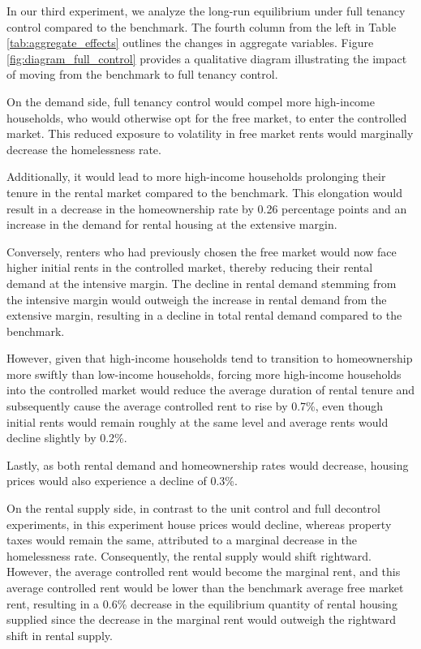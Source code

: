 \documentclass[parskip=full]{article}
\begin{document}
In our third experiment, we analyze the long-run equilibrium under full tenancy control compared to the benchmark. The fourth column from the left in Table \ref{tab:aggregate_effects} outlines the changes in aggregate variables. Figure \ref{fig:diagram_full_control} provides a qualitative diagram illustrating the impact of moving from the benchmark to full tenancy control.

On the demand side, full tenancy control would compel more high-income households, who would otherwise opt for the free market, to enter the controlled market. This reduced exposure to volatility in free market rents would marginally decrease the homelessness rate.

Additionally, it would lead to more high-income households prolonging their tenure in the rental market compared to the benchmark. This elongation would result in a decrease in the homeownership rate by 0.26 percentage points and an increase in the demand for rental housing at the extensive margin.

Conversely, renters who had previously chosen the free market would now face higher initial rents in the controlled market, thereby reducing their rental demand at the intensive margin. The decline in rental demand stemming from the intensive margin would outweigh the increase in rental demand from the extensive margin, resulting in a decline in total rental demand compared to the benchmark. 

However, given that high-income households tend to transition to homeownership more swiftly than low-income households, forcing more high-income households into the controlled market would reduce the average duration of rental tenure and subsequently cause the average controlled rent to rise by 0.7\%, even though initial rents would remain roughly at the same level and average rents would decline slightly by 0.2\%.

Lastly, as both rental demand and homeownership rates would decrease, housing prices would also experience a decline of 0.3\%.

On the rental supply side, in contrast to the unit control and full decontrol experiments, in this experiment house prices would decline, whereas property taxes would remain the same, attributed to a marginal decrease in the homelessness rate. Consequently, the rental supply would shift rightward. However, the average controlled rent would become the marginal rent, and this average controlled rent would be lower than the benchmark average free market rent, resulting in a 0.6\% decrease in the equilibrium quantity of rental housing supplied since the decrease in the marginal rent would outweigh the rightward shift in rental supply.
\end{document}
